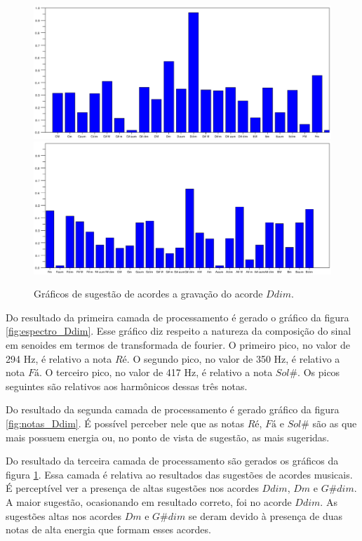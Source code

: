 \begin{figure}[h]
	\centering
		\includegraphics[keepaspectratio=true,scale=0.49]{figuras/Dm/acordes_1_Ddim.eps}
		\includegraphics[keepaspectratio=true,scale=0.49]{figuras/Dm/acordes_2_Ddim.eps}
	\caption{Gráficos de sugestão de acordes a gravação do acorde $Ddim$.}
  \label{fig:acordes_Ddim}
\end{figure}


Do resultado da primeira camada de processamento é gerado o gráfico da figura \ref{fig:espectro_Ddim}. Esse gráfico diz respeito a natureza da composição do sinal em senoides em termos de transformada de fourier. O primeiro pico, no valor de 294 Hz, é relativo a nota $Ré$. O segundo pico, no valor de 350 Hz, é relativo a nota $Fá$. O terceiro pico, no valor de 417 Hz, é relativo a nota $Sol\#$. Os picos seguintes são relativos aos harmônicos dessas três notas.

Do resultado da segunda camada de processamento é gerado gráfico da figura \ref{fig:notas_Ddim}. É possível perceber nele que as notas $Ré$, $Fá$ e $Sol\#$ são as que mais possuem energia ou, no ponto de vista de sugestão, as mais sugeridas.

Do resultado da terceira camada de processamento são gerados os gráficos da figura \ref{fig:acordes_Ddim}. Essa camada é relativa ao resultados das sugestões de acordes musicais. É perceptível ver a presença de altas sugestões nos acordes $Ddim$, $Dm$ e $G\#dim$. A maior sugestão, ocasionando em resultado correto, foi no acorde $Ddim$. As sugestões altas nos acordes $Dm$ e $G\#dim$ se deram devido à presença de duas notas de alta energia que formam esses acordes.

